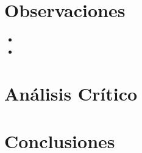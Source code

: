 \documentclass[12pt]{article}
\begin{document}
	\section{Observaciones}
        \begin{itemize}
            \item[\Checkmark]
        
            \item[\Checkmark] 
        \end{itemize}

	
	\section{Análisis Crítico}
	
	
	\section{Conclusiones}
    
\end{document}
